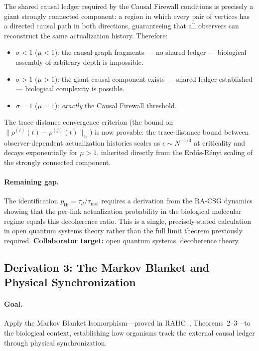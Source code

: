\documentclass[11pt,a4paper]{article}
\theoremstyle{plain}
\theoremstyle{definition}
\theoremstyle{remark}
\begin{document}
The shared causal ledger required by the Causal Firewall conditions is precisely
a giant strongly connected component: a region in which every pair of vertices
has a directed causal path in both directions, guaranteeing that all observers
can reconstruct the same actualization history. Therefore:

\begin{itemize}[noitemsep]
  \item $\sigma < 1$ ($\mu < 1$): the causal graph fragments --- no shared ledger
  --- biological assembly of arbitrary depth is impossible.
  \item $\sigma > 1$ ($\mu > 1$): the giant causal component exists --- shared
  ledger established --- biological complexity is possible.
  \item $\sigma = 1$ ($\mu = 1$): \emph{exactly} the Causal Firewall threshold.
\end{itemize}

The trace-distance convergence criterion (the bound on $\|\rho^{(i)}(t) - \rho^{(j)}(t)\|_{\mathrm{tr}}$) is now provable:
the trace-distance bound between observer-dependent actualization histories
scales as $\epsilon \sim N^{-1/3}$ at criticality and decays exponentially for
$\mu > 1$, inherited directly from the Erd\H{o}s-R\'{e}nyi scaling of the
strongly connected component.

\paragraph{Remaining gap.}
The identification $p_{\mathrm{th}} = \tau_d/\tau_{\mathrm{mol}}$ requires a
derivation from the RA-CSG dynamics showing that the per-link actualization
probability in the biological molecular regime equals this decoherence ratio.
This is a single, precisely-stated calculation in open quantum systems theory
rather than the full limit theorem previously required.
\textbf{Collaborator target:} open quantum systems, decoherence theory.

\subsection{Derivation 3: The Markov Blanket and Physical Synchronization}
\label{sec:markov}

\paragraph{Goal.} Apply the Markov Blanket Isomorphism---proved in
RAHC~\citep{Sandeman2026RAHC}, Theorems~2--3---to the biological context,
establishing how organisms track the external causal ledger through physical
synchronization.
\end{document}
